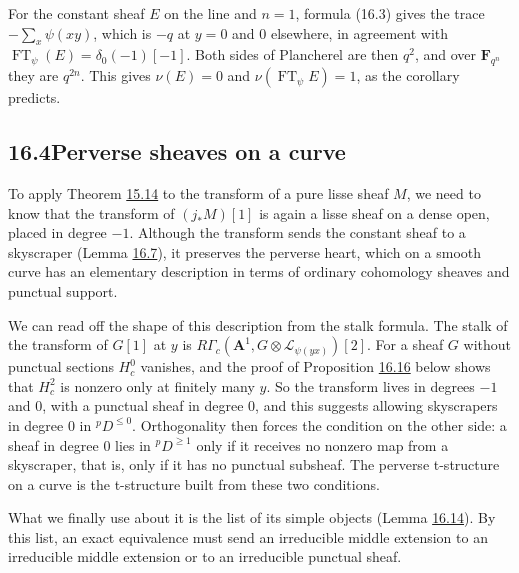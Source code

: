 \documentclass[11pt]{article}
\begin{document}
\label{bp194}%
For the constant sheaf \(E\) on the line and \(n=1\), formula (16.3) gives the trace \(-\sum_x\psi(xy)\), which is \(-q\) at \(y=0\) and \(0\) elsewhere, in agreement with \(\operatorname{FT}_\psi(E)=\delta_0(-1)[-1]\). Both sides of Plancherel are then \(q^2\), and over \(\mathbf F_{q^n}\) they are \(q^{2n}\). This gives \(\nu(E)=0\) and \(\nu(\operatorname{FT}_\psi E)=1\), as the corollary predicts.


\subsection*{\texorpdfstring{16.4\quad Perverse sheaves on a curve}{16.4 Perverse sheaves on a curve}}
\label{bp195}%
\label{bp196}%
To apply Theorem \hyperref[bp162]{15.14} to the transform of a pure lisse sheaf \(M\), we need to know that the transform of \((j_*M)[1]\) is again a lisse sheaf on a dense open, placed in degree \(-1\). Although the transform sends the constant sheaf to a skyscraper (Lemma \hyperref[bp188]{16.7}), it preserves the perverse heart, which on a smooth curve has an elementary description in terms of ordinary cohomology sheaves and punctual support.

We can read off the shape of this description from the stalk formula. The stalk of the transform of \(G[1]\) at \(y\) is \(R\Gamma_c(\mathbf A^1,G\otimes\mathcal L_{\psi(yx)})[2]\). For a sheaf \(G\) without punctual sections \(H^0_c\) vanishes, and the proof of Proposition \hyperref[bp214]{16.16} below shows that \(H^2_c\) is nonzero only at finitely many \(y\). So the transform lives in degrees \(-1\) and \(0\), with a punctual sheaf in degree \(0\), and this suggests allowing skyscrapers in degree \(0\) in \({}^pD^{\le0}\). Orthogonality then forces the condition on the other side: a sheaf in degree \(0\) lies in \({}^pD^{\ge1}\) only if it receives no nonzero map from a skyscraper, that is, only if it has no punctual subsheaf. The perverse t-structure on a curve is the t-structure built from these two conditions.

What we finally use about it is the list of its simple objects (Lemma \hyperref[bp209]{16.14}). By this list, an exact equivalence must send an irreducible middle extension to an irreducible middle extension or to an irreducible punctual sheaf.
\end{document}
